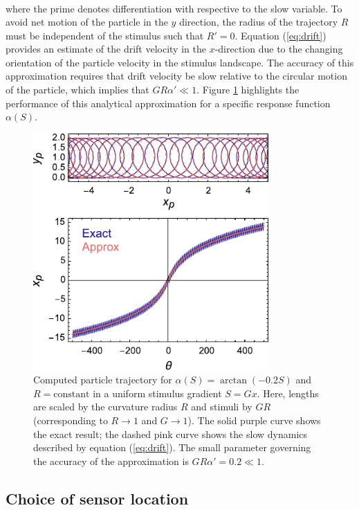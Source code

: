 \begin{appendices}
\begin{align}
\end{align}
where the prime denotes differentiation with respective to the slow variable. To avoid net motion of the particle in the $y$ direction, the radius of the trajectory $R$ must be independent of the stimulus such that $R'=0$.  Equation (\ref{eq:drift}) provides an estimate of the drift velocity in the $x$-direction due to the changing orientation of the particle velocity in the stimulus landscape.  The accuracy of this approximation requires that drift velocity be slow relative to the circular motion of the particle, which implies that $G R\alpha' \ll 1$.  Figure \ref{fig:SimpleModel} highlights the performance of this analytical approximation for a specific response function $\alpha(S)$.
\begin{figure}[h]
    \centering
    \includegraphics[width=9cm]{figures/A3_SimpleModel.pdf}
    \caption{Computed particle trajectory for $\alpha(S) = \arctan(-0.2 S)$ and $R=\text{constant}$ in a uniform stimulus gradient $S=G x$. Here, lengths are scaled by the curvature radius $R$ and stimuli by $GR$ (corresponding to $R\rightarrow1$ and $G\rightarrow1$). The solid purple curve shows the exact result; the dashed pink curve shows the slow dynamics described by equation (\ref{eq:drift}). The small parameter governing the accuracy of the approximation is $G R\alpha' = 0.2 \ll 1$.}
    \label{fig:SimpleModel}
\end{figure}


\subsection{Choice of sensor location}


\end{appendices}
